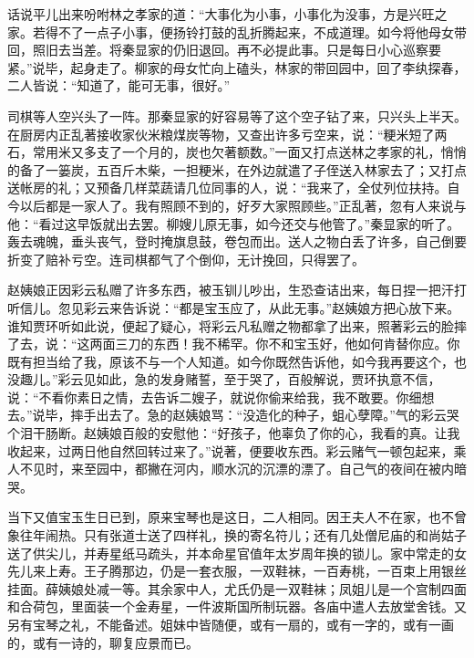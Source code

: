 

\begin{parag}
    话说平儿出来吩咐林之孝家的道：“大事化为小事，小事化为没事，方是兴旺之家。若得不了一点子小事，便扬铃打鼓的乱折腾起来，不成道理。如今将他母女带回，照旧去当差。将秦显家的仍旧退回。再不必提此事。只是每日小心巡察要紧。”说毕，起身走了。柳家的母女忙向上磕头，林家的带回园中，回了李纨探春，二人皆说：“知道了，能可无事，很好。”
\end{parag}


\begin{parag}
    司棋等人空兴头了一阵。那秦显家的好容易等了这个空子钻了来，只兴头上半天。在厨房内正乱著接收家伙米粮煤炭等物，又查出许多亏空来，说：“粳米短了两石，常用米又多支了一个月的，炭也欠著额数。”一面又打点送林之孝家的礼，悄悄的备了一篓炭，五百斤木柴，一担粳米，在外边就遣了子侄送入林家去了；又打点送帐房的礼；又预备几样菜蔬请几位同事的人，说：“我来了，全仗列位扶持。自今以后都是一家人了。我有照顾不到的，好歹大家照顾些。”正乱著，忽有人来说与他：“看过这早饭就出去罢。柳嫂儿原无事，如今还交与他管了。”秦显家的听了。轰去魂魄，垂头丧气，登时掩旗息鼓，卷包而出。送人之物白丢了许多，自己倒要折变了赔补亏空。连司棋都气了个倒仰，无计挽回，只得罢了。
\end{parag}


\begin{parag}
    赵姨娘正因彩云私赠了许多东西，被玉钏儿吵出，生恐查诘出来，每日捏一把汗打听信儿。忽见彩云来告诉说：“都是宝玉应了，从此无事。”赵姨娘方把心放下来。谁知贾环听如此说，便起了疑心，将彩云凡私赠之物都拿了出来，照著彩云的脸摔了去，说：“这两面三刀的东西！我不稀罕。你不和宝玉好，他如何肯替你应。你既有担当给了我，原该不与一个人知道。如今你既然告诉他，如今我再要这个，也没趣儿。”彩云见如此，急的发身赌誓，至于哭了，百般解说，贾环执意不信，说：“不看你素日之情，去告诉二嫂子，就说你偷来给我，我不敢要。你细想去。”说毕，摔手出去了。急的赵姨娘骂：“没造化的种子，蛆心孽障。”气的彩云哭个泪干肠断。赵姨娘百般的安慰他：“好孩子，他辜负了你的心，我看的真。让我收起来，过两日他自然回转过来了。”说著，便要收东西。彩云赌气一顿包起来，乘人不见时，来至园中，都撇在河内，顺水沉的沉漂的漂了。自己气的夜间在被内暗哭。
\end{parag}


\begin{parag}
    当下又值宝玉生日已到，原来宝琴也是这日，二人相同。因王夫人不在家，也不曾象往年闹热。只有张道士送了四样礼，换的寄名符儿；还有几处僧尼庙的和尚姑子送了供尖儿，并寿星纸马疏头，并本命星官值年太岁周年换的锁儿。家中常走的女先儿来上寿。王子腾那边，仍是一套衣服，一双鞋袜，一百寿桃，一百束上用银丝挂面。薛姨娘处减一等。其余家中人，尤氏仍是一双鞋袜；凤姐儿是一个宫制四面和合荷包，里面装一个金寿星，一件波斯国所制玩器。各庙中遣人去放堂舍钱。又另有宝琴之礼，不能备述。姐妹中皆随便，或有一扇的，或有一字的，或有一画的，或有一诗的，聊复应景而已。
\end{parag}


